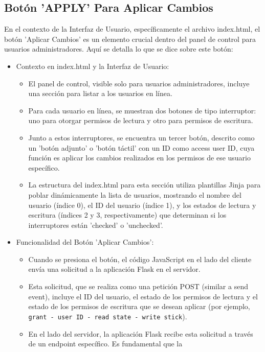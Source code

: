 \documentclass{report}
\begin{document}
\subsection{Botón 'APPLY' Para Aplicar Cambios}
En el contexto de la Interfaz de Usuario, específicamente el archivo index.html, el botón 'Aplicar Cambios' es un elemento crucial 
dentro del panel de control para usuarios administradores.
Aquí se detalla lo que se dice sobre este botón:
\begin{itemize}
    \item Contexto en index.html y la Interfaz de Usuario:
    \begin{itemize}
        \item El panel de control, visible solo para usuarios administradores, incluye una sección para listar a los usuarios en línea.
        \item Para cada usuario en línea, se muestran dos botones de tipo interruptor: uno para otorgar permisos de lectura y otro para 
        permisos de escritura.
        \item Junto a estos interruptores, se encuentra un tercer botón, descrito como un 'botón adjunto' o 'botón táctil' con un ID como 
        access user ID, cuya función es aplicar los cambios realizados en los permisos de ese usuario específico.
        \item La estructura del index.html para esta sección utiliza plantillas Jinja para poblar dinámicamente la lista de usuarios, 
        mostrando el nombre del usuario (índice 0), el ID del usuario (índice 1), y los estados de lectura y escritura (índices 2 y 3, 
        respectivamente) que determinan si los interruptores están 'checked' o 'unchecked'.
    \end{itemize}
    \item Funcionalidad del Botón 'Aplicar Cambios':
    \begin{itemize}
        \item Cuando se presiona el botón, el código JavaScript en el lado del cliente envía una solicitud a la aplicación Flask en el servidor.
        \item Esta solicitud, que se realiza como una petición POST (similar a send event), incluye el ID del usuario, el estado de los permisos 
        de lectura y el estado de los permisos de escritura que se desean aplicar (por ejemplo, \verb|grant - user ID - read state - write stick|).
        \item En el lado del servidor, la aplicación Flask recibe esta solicitud a través de un endpoint específico. Es fundamental que la 

\end{itemize}
\end{itemize}
\end{document}
